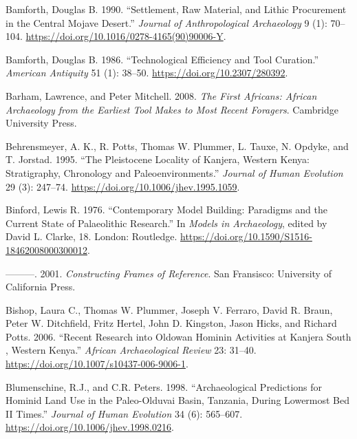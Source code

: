 \documentclass[]{elsarticle} %
\begin{document}
\leavevmode\hypertarget{ref-bamforthSettlementRawMaterial1990}{}%
Bamforth, Douglas B. 1990. ``Settlement, Raw Material, and Lithic
Procurement in the Central Mojave Desert.'' \emph{Journal of
Anthropological Archaeology} 9 (1): 70--104.
\url{https://doi.org/10.1016/0278-4165(90)90006-Y}.

\leavevmode\hypertarget{ref-bamforthTechnologicalEfficiencyTool1986}{}%
Bamforth, Douglas B. 1986. ``Technological Efficiency and Tool
Curation.'' \emph{American Antiquity} 51 (1): 38--50.
\url{https://doi.org/10.2307/280392}.

\leavevmode\hypertarget{ref-barhamFirstAfricansAfrican2008}{}%
Barham, Lawrence, and Peter Mitchell. 2008. \emph{The First Africans:
African Archaeology from the Earliest Tool Makes to Most Recent
Foragers}. Cambridge University Press.

\leavevmode\hypertarget{ref-behrensmeyerPleistoceneLocalityKanjera1995}{}%
Behrensmeyer, A. K., R. Potts, Thomas W. Plummer, L. Tauxe, N. Opdyke,
and T. Jorstad. 1995. ``The Pleistocene Locality of Kanjera, Western
Kenya: Stratigraphy, Chronology and Paleoenvironments.'' \emph{Journal
of Human Evolution} 29 (3): 247--74.
\url{https://doi.org/10.1006/jhev.1995.1059}.

\leavevmode\hypertarget{ref-binfordContemporaryModelBuilding1976}{}%
Binford, Lewis R. 1976. ``Contemporary Model Building: Paradigms and the
Current State of Palaeolithic Research.'' In \emph{Models in
Archaeology}, edited by David L. Clarke, 18. London: Routledge.
\url{https://doi.org/10.1590/S1516-18462008000300012}.

\leavevmode\hypertarget{ref-binfordConstructingFramesReference2001}{}%
---------. 2001. \emph{Constructing Frames of Reference}. San Fransisco:
University of California Press.

\leavevmode\hypertarget{ref-bishopRecentResearchOldowan2006}{}%
Bishop, Laura C., Thomas W. Plummer, Joseph V. Ferraro, David R. Braun,
Peter W. Ditchfield, Fritz Hertel, John D. Kingston, Jason Hicks, and
Richard Potts. 2006. ``Recent Research into Oldowan Hominin Activities
at Kanjera South , Western Kenya.'' \emph{African Archaeological Review}
23: 31--40. \url{https://doi.org/10.1007/s10437-006-9006-1}.

\leavevmode\hypertarget{ref-blumenschineArchaeologicalPredictionsHominid1998}{}%
Blumenschine, R.J., and C.R. Peters. 1998. ``Archaeological Predictions
for Hominid Land Use in the Paleo-Olduvai Basin, Tanzania, During
Lowermost Bed II Times.'' \emph{Journal of Human Evolution} 34 (6):
565--607. \url{https://doi.org/10.1006/jhev.1998.0216}.
\end{document}
